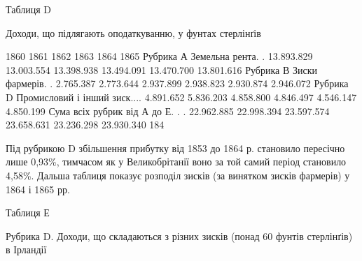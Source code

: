 Таблиця D

Доходи, що підлягають оподаткуванню, у фунтах стерлінґів

                                              1860    1861    1862    1863    1864    1865
Рубрика А
Земельна рента. .    13.893.829    13.003.554    13.398.938    13.494.091    13.470.700
13.801.616
Рубрика В
Зиски фармерів. .    2.765.387    2.773.644    2.937.899    2.938.823    2.930.874    2.946.072
Рубрика D
Промисловий і інший
зиск....    4.891.652    5.836.203    4.858.800    4.846.497    4.546.147    4.850.199
Сума всіх рубрик
від А до Е. . .    22.962.885    22.998.394    23.597.574    23.658.631    23.236.298     23.930.340
184

Під рубрикою D збільшення прибутку від 1853 до 1864 р.
становило пересічно лише 0,93\%, тимчасом як у Великобрітанії
воно за той самий період становило 4,58\%. Дальша таблиця показує
розподіл зисків (за винятком зисків фармерів) у 1864 і
1865 рр.

Таблиця Е

Рубрика D. Доходи, що складаються з різних зисків (понад 60 фунтів
стерлінґів) в Ірландії

